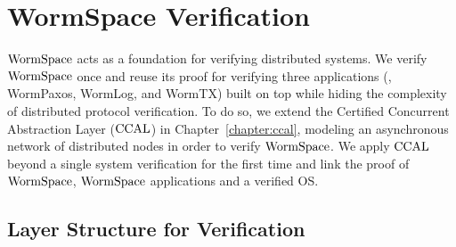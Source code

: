\section{WormSpace Verification}
\label{sec:formal_verification}


$\mathrm{WormSpace}$ acts as a foundation for verifying distributed systems. 
We verify $\mathrm{WormSpace}$ once and reuse its proof for verifying three applications (\ie, WormPaxos, WormLog, and WormTX)
built on top while  hiding the complexity of distributed protocol verification. 	
To do so, we extend the Certified Concurrent Abstraction Layer ($\mathrm{CCAL}$)  in Chapter~\ref{chapter:ccal}, 
modeling an asynchronous network of distributed nodes in order to verify $\mathrm{WormSpace}$. 
We apply $\mathrm{CCAL}$ beyond a single system verification for the first time and link the proof of $\mathrm{WormSpace}$, 
$\mathrm{WormSpace}$ applications and a verified OS. 

\subsection{Layer Structure for Verification}

